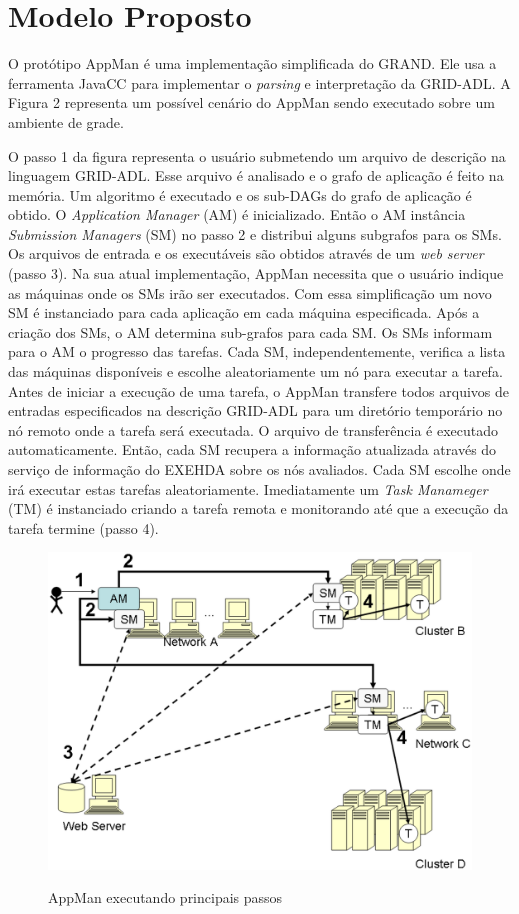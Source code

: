 \section{Modelo Proposto}
\label{cap:modelo proposto}


O protótipo AppMan é uma implementação simplificada do GRAND. Ele usa a ferramenta JavaCC para implementar o {\it parsing} e interpretação da GRID-ADL. A Figura 2 representa um possível cenário do AppMan sendo executado sobre um ambiente de grade.

O passo 1 da figura representa o usuário submetendo um arquivo de descrição na linguagem GRID-ADL. Esse arquivo é analisado e o grafo de aplicação é feito na memória. Um algoritmo é executado e os sub-DAGs do grafo de aplicação é obtido. O {\it Application Manager} (AM) é inicializado. Então o AM instância {\it Submission Managers} (SM) no passo 2 e distribui alguns subgrafos para os SMs. Os arquivos de entrada e os executáveis são obtidos através de um {\it web server} (passo 3). Na sua atual implementação, AppMan necessita que o usuário indique as máquinas onde os SMs irão ser executados. Com essa simplificação um novo SM é instanciado para cada aplicação em cada máquina especificada. Após a criação dos SMs, o AM determina sub-grafos para cada SM. Os SMs informam para o AM o progresso das tarefas. Cada SM, independentemente, verifica a lista das máquinas disponíveis e escolhe aleatoriamente um nó para executar a tarefa. Antes de iniciar a execução de uma tarefa, o AppMan transfere todos arquivos de entradas especificados na descrição GRID-ADL para um diretório temporário no nó remoto onde a tarefa será executada. O arquivo de transferência é executado automaticamente. Então, cada SM recupera a informação atualizada através do serviço de informação do EXEHDA sobre os nós avaliados. Cada SM escolhe onde irá executar estas tarefas aleatoriamente. Imediatamente um {\it Task Manameger} (TM) é instanciado criando a tarefa remota e monitorando até que a execução da tarefa termine (passo 4).

\begin{figure}[hbtp]
\center
\includegraphics[scale=.1]{img/AppMan.eps}
\label{AppMan}
\caption{AppMan executando principais passos}
\end{figure}

